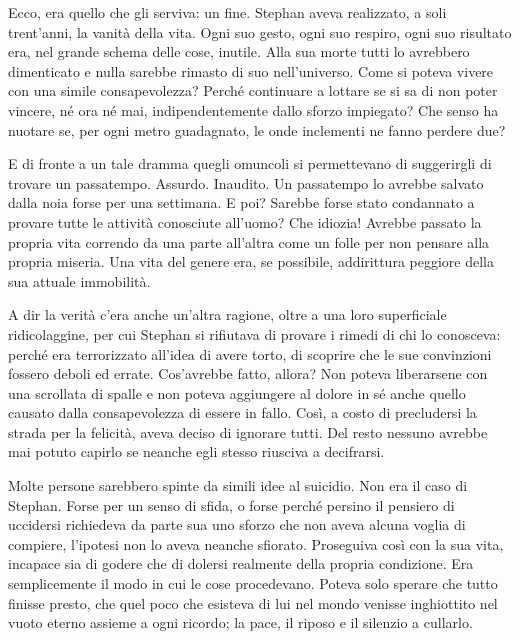 \documentclass[a4paper,12pt,oneside]{memoir}
\begin{document}
Ecco, era quello che gli serviva: un fine. Stephan aveva realizzato, a soli
trent'anni, la vanità della vita. Ogni suo gesto, ogni suo respiro, ogni suo
risultato era, nel grande schema delle cose, inutile. Alla sua morte tutti lo
avrebbero dimenticato e nulla sarebbe rimasto di suo nell'universo. Come si
poteva vivere con una simile consapevolezza? Perché continuare a lottare se si
sa di non poter vincere, né ora né mai, indipendentemente dallo sforzo
impiegato? Che senso ha nuotare se, per ogni metro guadagnato, le onde
inclementi ne fanno perdere due?

E di fronte a un tale dramma quegli omuncoli si permettevano di suggerirgli di
trovare un passatempo. Assurdo. Inaudito. Un passatempo lo avrebbe salvato dalla
noia forse per una settimana. E poi? Sarebbe forse stato condannato a provare
tutte le attività conosciute all'uomo? Che idiozia! Avrebbe passato la propria
vita correndo da una parte all'altra come un folle per non pensare alla propria
miseria. Una vita del genere era, se possibile, addirittura peggiore della sua
attuale immobilità.

A dir la verità c'era anche un'altra ragione, oltre a una loro superficiale
ridicolaggine, per cui Stephan si rifiutava di provare i rimedi di chi lo
conosceva: perché era terrorizzato all'idea di avere torto, di scoprire che le
sue convinzioni fossero deboli ed errate. Cos'avrebbe fatto, allora? Non poteva
liberarsene con una scrollata di spalle e non poteva aggiungere al dolore in sé
anche quello causato dalla consapevolezza di essere in fallo. Così, a costo di
precludersi la strada per la felicità, aveva deciso di ignorare tutti. Del resto
nessuno avrebbe mai potuto capirlo se neanche egli stesso riusciva a decifrarsi.

Molte persone sarebbero spinte da simili idee al suicidio. Non era il caso di
Stephan. Forse per un senso di sfida, o forse perché persino il pensiero di
uccidersi richiedeva da parte sua uno sforzo che non aveva alcuna voglia di
compiere, l'ipotesi non lo aveva neanche sfiorato. Proseguiva così con la sua
vita, incapace sia di godere che di dolersi realmente della propria condizione.
Era semplicemente il modo in cui le cose procedevano. Poteva solo sperare che
tutto finisse presto, che quel poco che esisteva di lui nel mondo venisse
inghiottito nel vuoto eterno assieme a ogni ricordo; la pace, il riposo e il
silenzio a cullarlo.



\end{document}
